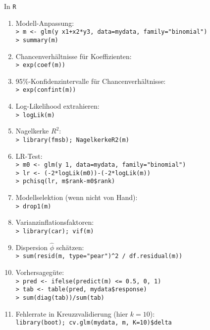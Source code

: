 \begin{frame}[allowframebreaks]
  {In \texttt{R}}
  \small
  \begin{enumerate}[<+->]
    \item Modell-Anpassung:\\
      \texttt{> m <- glm(y~x1+x2*y3, data=mydata, family="binomial")}\\
      \texttt{> summary(m)}
    \item Chancenverhältnisse für Koeffizienten:\\
      \texttt{> exp(coef(m))}
    \item 95\%-Konfidenzintervalle für Chancenverhältnisse:\\
      \texttt{> exp(confint(m))}
    \item Log-Likelihood extrahieren:\\
      \texttt{> logLik(m)}
    \item Nagelkerke $R^2$:\\
      \texttt{> library(fmsb); NagelkerkeR2(m)}
    \item LR-Test:\\
      \texttt{> m0 <- glm(y~1, data=mydata, family="binomial")}\\
      \texttt{> lr <- (-2*logLik(m0))-(-2*logLik(m))}\\
      \texttt{> pchisq(lr, m\$rank-m0\$rank)}
    \item Modellselektion (wenn nicht von Hand):\\
      \texttt{> drop1(m)}
    \item Varianzinflationsfaktoren:\\
      \texttt{> library(car); vif(m)}
    \item Dispersion $\hat{\phi}$ schätzen:\\
      \texttt{> sum(resid(m, type="pear")\^{}2 / df.residual(m))}
    \item Vorhersagegüte:\\
      \texttt{> pred <- ifelse(predict(m) <= 0.5, 0, 1)}\\
      \texttt{> tab  <- table(pred, mydata\$response)}\\
      \texttt{> sum(diag(tab))/sum(tab)}
    \item Fehlerrate in Kreuzzvalidierung (hier $k=10$):\\
      \texttt{library(boot); cv.glm(mydata, m, K=10)\$delta}
  \end{enumerate}
\end{frame}
